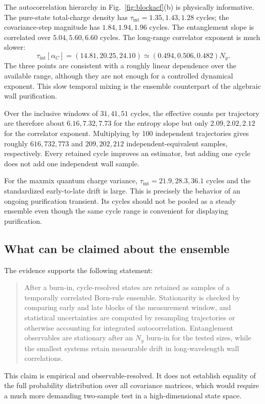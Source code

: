 \documentclass[aps,prb,twocolumn,nofootinbib,superscriptaddress,floatfix]{revtex4-2}
\newcommand{\Tint}{\tau_{\mathrm{int}}}
\begin{document}
The autocorrelation hierarchy in Fig.~\ref{fig:blockacf}(b) is physically
informative.  The pure-state total-charge density has
$\Tint=1.35,1.43,1.28$ cycles; the covariance-step magnitude has
$1.84,1.94,1.96$ cycles.  The entanglement slope is correlated over
$5.04,5.60,6.60$ cycles.  The long-range correlator exponent is much slower:
\begin{equation}
 \Tint[\alpha_C]=(14.81,20.25,24.10)
 \simeq(0.494,0.506,0.482)N_y.
 \label{eq:correlatortauscaling}
\end{equation}
The three points are consistent with a roughly linear dependence over the
available range, although they are not enough for a controlled dynamical
exponent.  This slow temporal mixing is the ensemble counterpart of the
algebraic wall purification.

Over the inclusive windows of $31,41,51$ cycles, the effective counts per
trajectory are therefore about $6.16,7.32,7.73$ for the entropy slope but only
$2.09,2.02,2.12$ for the correlator exponent.  Multiplying by 100 independent
trajectories gives roughly $616,732,773$ and $209,202,212$
independent-equivalent samples, respectively.  Every retained cycle improves
an estimator, but adding one cycle does not add one independent wall sample.

For the maxmix quantum charge variance,
$\Tint=21.9,28.3,36.1$ cycles and the standardized early-to-late drift is large.
This is precisely the behavior of an ongoing purification transient.  Its
cycles should not be pooled as a steady ensemble even though the same cycle
range is convenient for displaying purification.

\subsection{What can be claimed about the ensemble}

The evidence supports the following statement:
\begin{quote}
After a burn-in, cycle-resolved states are retained as samples of a temporally
correlated Born-rule ensemble.  Stationarity is checked by comparing early and
late blocks of the measurement window, and statistical uncertainties are
computed by resampling trajectories or otherwise accounting for integrated
autocorrelation.  Entanglement observables are stationary after an $N_y$ burn-in
for the tested sizes, while the smallest systems retain measurable drift in
long-wavelength wall correlations.
\end{quote}
This claim is empirical and observable-resolved.  It does not establish equality
of the full probability distribution over all covariance matrices, which would
require a much more demanding two-sample test in a high-dimensional state
space.
\end{document}
